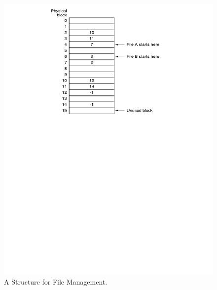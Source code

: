 \documentclass[12pt,epsf,psfig,graphics]{article}
\begin{document}
\begin{enumerate}
  \begin{figure}[p]
    \centering
    \includegraphics{fig412}
    \vspace*{-6.75in}
    \caption{A Structure for File Management.}
    \label{fig:fat}
  \end{figure}

% 
% 
% 
% 
% 
% 


\end{enumerate}
\end{document}
